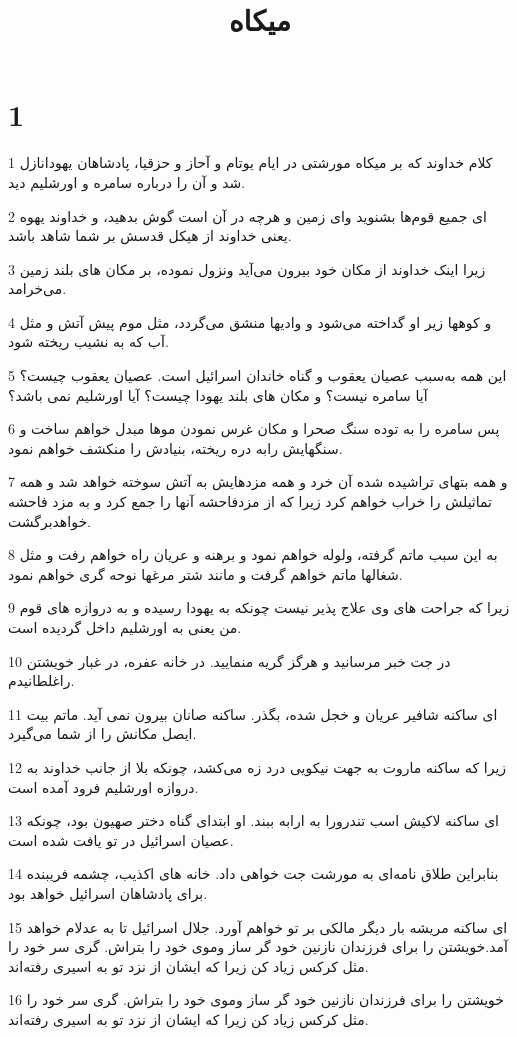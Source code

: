 

\title{ميکاه}


\chapter{1}

\par 1 کلام خداوند که بر میکاه مورشتی در ایام یوتام و آحاز و حزقیا، پادشاهان یهودانازل شد و آن را درباره سامره و اورشلیم دید.
\par 2 ‌ای جمیع قوم‌ها بشنوید و‌ای زمین و هر‌چه در آن است گوش بدهید، و خداوند یهوه یعنی خداوند از هیکل قدسش بر شما شاهد باشد.
\par 3 زیرا اینک خداوند از مکان خود بیرون می‌آید ونزول نموده، بر مکان های بلند زمین می‌خرامد.
\par 4 و کوهها زیر او گداخته می‌شود و وادیها منشق می‌گردد، مثل موم پیش آتش و مثل آب که به نشیب ریخته شود.
\par 5 این همه به‌سبب عصیان یعقوب و گناه خاندان اسرائیل است. عصیان یعقوب چیست؟ آیا سامره نیست؟ و مکان های بلند یهودا چیست؟ آیا اورشلیم نمی باشد؟
\par 6 پس سامره را به توده سنگ صحرا و مکان غرس نمودن موها مبدل خواهم ساخت و سنگهایش رابه دره ریخته، بنیادش را منکشف خواهم نمود.
\par 7 و همه بتهای تراشیده شده آن خرد و همه مزدهایش به آتش سوخته خواهد شد و همه تماثیلش را خراب خواهم کرد زیرا که از مزدفاحشه آنها را جمع کرد و به مزد فاحشه خواهدبرگشت.
\par 8 به این سبب ماتم گرفته، ولوله خواهم نمود و برهنه و عریان راه خواهم رفت و مثل شغالها ماتم خواهم گرفت و مانند شتر مرغها نوحه گری خواهم نمود.
\par 9 زیرا که جراحت های وی علاج پذیر نیست چونکه به یهودا رسیده و به دروازه های قوم من یعنی به اورشلیم داخل گردیده است.
\par 10 در جت خبر مرسانید و هرگز گریه منمایید. در خانه عفره، در غبار خویشتن راغلطانیدم.
\par 11 ‌ای ساکنه شافیر عریان و خجل شده، بگذر. ساکنه صانان بیرون نمی آید. ماتم بیت ایصل مکانش را از شما می‌گیرد.
\par 12 زیرا که ساکنه ماروت به جهت نیکویی درد زه می‌کشد، چونکه بلا از جانب خداوند به دروازه اورشلیم فرود آمده است.
\par 13 ‌ای ساکنه لاکیش اسب تندرورا به ارابه ببند. او ابتدای گناه دختر صهیون بود، چونکه عصیان اسرائیل در تو یافت شده است.
\par 14 بنابراین طلاق نامه‌ای به مورشت جت خواهی داد. خانه های اکذیب، چشمه فریبنده برای پادشاهان اسرائیل خواهد بود.
\par 15 ‌ای ساکنه مریشه بار دیگر مالکی بر تو خواهم آورد. جلال اسرائیل تا به عدلام خواهد آمد.خویشتن را برای فرزندان نازنین خود گر ساز وموی خود را بتراش. گری سر خود را مثل کرکس زیاد کن زیرا که ایشان از نزد تو به اسیری رفته‌اند.
\par 16 خویشتن را برای فرزندان نازنین خود گر ساز وموی خود را بتراش. گری سر خود را مثل کرکس زیاد کن زیرا که ایشان از نزد تو به اسیری رفته‌اند.

